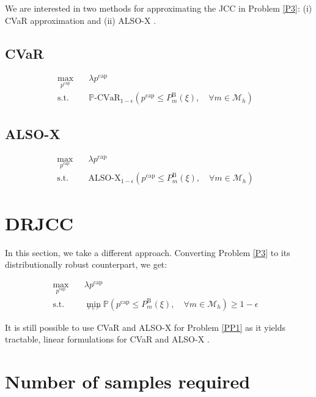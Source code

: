 \documentclass{report}
\begin{document}
We are interested in two methods for approximating the JCC in Problem \ref{P3}: (i) CVaR approximation and (ii) ALSO-X \cite{jiang2022also}.

\subsection*{CVaR}

\begin{align}\label{P4}
    \max_{p^{\text{cap}}} \quad & \lambda p^{\text{cap}}                                                                                                                \\
    \text{s.t.} \quad           & \mathbb{P}\text{-CVaR}_{1-\epsilon} \left( p^{\text{cap}} \leq P_{m}^{\text{B}}(\xi), \quad \forall{m} \in \mathcal{M}_{h}  \right) &
\end{align}

\subsection*{ALSO-X}

\begin{align}\label{P5}
    \max_{p^{\text{cap}}} \quad & \lambda p^{\text{cap}}                                                                                                       \\
    \text{s.t.} \quad           & \text{ALSO-X}_{1-\epsilon} \left( p^{\text{cap}} \leq P_{m}^{\text{B}}(\xi), \quad \forall{m} \in \mathcal{M}_{h}  \right) &
\end{align}

\section*{DRJCC}

In this section, we take a different approach. Converting Problem \ref{P3} to its distributionally robust counterpart, we get:

\begin{align}\label{PP1}
    \max_{p^{\text{cap}}} \quad & \lambda p^{\text{cap}}                                                                                                                                               \\
    \text{s.t.} \quad           & \min_{_{\mathbb{P} \in \mathcal{P}}}  \mathbb{P} \left( p^{\text{cap}} \leq P_{m}^{\text{B}}(\xi), \quad \forall{m} \in \mathcal{M}_{h}  \right) \geq 1 - \epsilon &
\end{align}

It is still possible to use CVaR and ALSO-X for Problem \ref{PP1} as it yields tractable, linear formulations \cite{ordoudis2021energy} for CVaR and ALSO-X \cite{jiang2023also}.

\section*{Number of samples required}

\printbibliography
\end{document}
